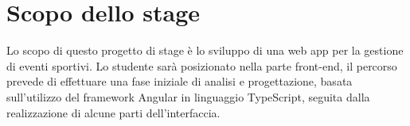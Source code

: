 \section*{Scopo dello stage}
Lo scopo di questo progetto di stage è lo sviluppo di una web app per la gestione di eventi sportivi.
Lo studente sarà posizionato nella parte front-end, il percorso prevede di effettuare una fase iniziale di analisi e progettazione, basata sull’utilizzo del framework Angular in linguaggio TypeScript, seguita dalla realizzazione di alcune parti dell’interfaccia.

